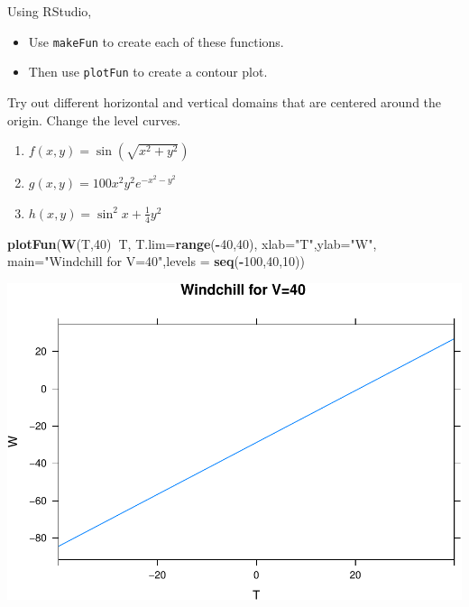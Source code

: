 \documentclass[
]{book}
\newenvironment{Shaded}{\begin{snugshade}}{\end{snugshade}}
\newcommand{\DataTypeTok}[1]{\textcolor[rgb]{0.13,0.29,0.53}{#1}}
\newcommand{\DecValTok}[1]{\textcolor[rgb]{0.00,0.00,0.81}{#1}}
\newcommand{\KeywordTok}[1]{\textcolor[rgb]{0.13,0.29,0.53}{\textbf{#1}}}
\newcommand{\NormalTok}[1]{#1}
\newcommand{\OperatorTok}[1]{\textcolor[rgb]{0.81,0.36,0.00}{\textbf{#1}}}
\newcommand{\StringTok}[1]{\textcolor[rgb]{0.31,0.60,0.02}{#1}}
\providecommand{\tightlist}{%
  \setlength{\itemsep}{0pt}\setlength{\parskip}{0pt}}
\begin{document}
Using RStudio,

\begin{itemize}
\tightlist
\item
  Use \texttt{makeFun} to create each of these functions.
\item
  Then use \texttt{plotFun} to create a contour plot.
\end{itemize}

Try out different horizontal and vertical domains that are centered around the origin. Change the level curves.

\begin{enumerate}
\def\labelenumi{\arabic{enumi}.}
\tightlist
\item
  \(f(x,y) = \sin(\sqrt{x^2+y^2})\)
\item
  \(g(x,y) = 100 x^2 y^2 e^{-x^2-y^2}\)
\item
  \(h(x,y) = \sin^2x + \frac{1}{4}y^2\)
\end{enumerate}

\begin{Shaded}
\begin{Highlighting}[]
\KeywordTok{plotFun}\NormalTok{(}\KeywordTok{W}\NormalTok{(T,}\DecValTok{40}\NormalTok{)}\OperatorTok{~}\NormalTok{T, }\DataTypeTok{T.lim=}\KeywordTok{range}\NormalTok{(}\OperatorTok{-}\DecValTok{40}\NormalTok{,}\DecValTok{40}\NormalTok{), }\DataTypeTok{xlab=}\StringTok{"T"}\NormalTok{,}\DataTypeTok{ylab=}\StringTok{"W"}\NormalTok{,  }\DataTypeTok{main=}\StringTok{"Windchill for V=40"}\NormalTok{,}\DataTypeTok{levels =} \KeywordTok{seq}\NormalTok{(}\OperatorTok{-}\DecValTok{100}\NormalTok{,}\DecValTok{40}\NormalTok{,}\DecValTok{10}\NormalTok{))}
\end{Highlighting}
\end{Shaded}

\includegraphics{_bookdown_files/math135_handbook_files/figure-latex/unnamed-chunk-76-2.pdf}
\end{document}
